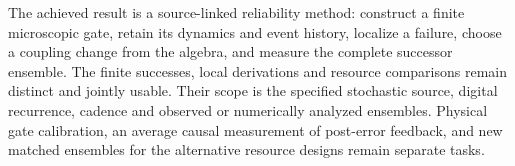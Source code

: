 The achieved result is a source-linked reliability method: construct a finite microscopic gate, retain its dynamics and event history, localize a failure, choose a coupling change from the algebra, and measure the complete successor ensemble. The finite successes, local derivations and resource comparisons remain distinct and jointly usable. Their scope is the specified stochastic source, digital recurrence, cadence and observed or numerically analyzed ensembles. Physical gate calibration, an average causal measurement of post-error feedback, and new matched ensembles for the alternative resource designs remain separate tasks.
